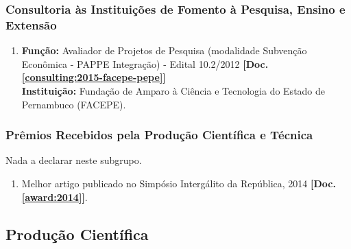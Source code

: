 \documentclass[a4paper,oneside,12pt]{article}
\begin{document}

\subsubsection{Consultoria às Instituições de Fomento à Pesquisa, Ensino e Extensão}
\vspace{0.3cm}

\begin{enumerate}
\renewcommand{\labelenumi}{{\large\bfseries\arabic{enumi}.}}

\item   \textbf{Função:} Avaliador de Projetos de Pesquisa (modalidade Subvenção Econ\^{o}mica - PAPPE Integração) - Edital 10.2/2012 \textbf{[Doc. \ref{consulting:2015-facepe-pepe}]}\\
        \textbf{Instituição:} Fundação de Amparo à Ciência e Tecnologia do Estado de Pernambuco (FACEPE).

\end{enumerate}


\subsubsection{Prêmios Recebidos pela Produção Científica e Técnica}
\vspace{0.3cm}

Nada a declarar neste subgrupo.

\begin{enumerate}
\renewcommand{\labelenumi}{{\large\bfseries\arabic{enumi}.}}

\item Melhor artigo publicado no Simpósio Intergálito da República, 2014 \textbf{[Doc. \ref{award:2014}]}.

\end{enumerate}


\subsection{Produção Científica}
\vspace{0.3cm}
\end{document}
